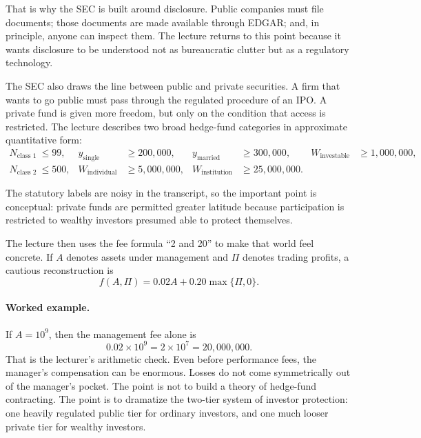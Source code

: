 That is why the SEC is built around disclosure. Public companies must file documents; those documents are made available through EDGAR; and, in principle, anyone can inspect them. The lecture returns to this point because it wants disclosure to be understood not as bureaucratic clutter but as a regulatory technology.

The SEC also draws the line between public and private securities. A firm that wants to go public must pass through the regulated procedure of an IPO. A private fund is given more freedom, but only on the condition that access is restricted. The lecture describes two broad hedge-fund categories in approximate quantitative form:
\begin{align}
N_{\text{class 1}} &\le 99,
&
y_{\text{single}} &\ge 200{,}000,
&
y_{\text{married}} &\ge 300{,}000,
&
W_{\text{investable}} &\ge 1{,}000{,}000,
\\
N_{\text{class 2}} &\le 500,
&
W_{\text{individual}} &\ge 5{,}000{,}000,
&
W_{\text{institution}} &\ge 25{,}000{,}000.
\end{align}

The statutory labels are noisy in the transcript, so the important point is conceptual: private funds are permitted greater latitude because participation is restricted to wealthy investors presumed able to protect themselves.

The lecture then uses the fee formula ``2 and 20'' to make that world feel concrete. If \(A\) denotes assets under management and \(\Pi\) denotes trading profits, a cautious reconstruction is
\begin{equation}
f(A,\Pi)=0.02A+0.20\max\{\Pi,0\}.
\end{equation}

\paragraph{Worked example.} If \(A=10^9\), then the management fee alone is
\begin{equation}
0.02\times 10^9 = 2\times 10^7 = 20{,}000{,}000.
\end{equation}
That is the lecturer's arithmetic check. Even before performance fees, the manager's compensation can be enormous. Losses do not come symmetrically out of the manager's pocket. The point is not to build a theory of hedge-fund contracting. The point is to dramatize the two-tier system of investor protection: one heavily regulated public tier for ordinary investors, and one much looser private tier for wealthy investors.

